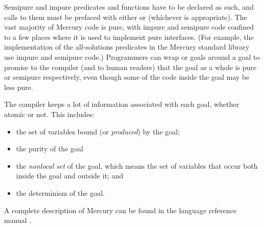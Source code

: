 \noindent
Semipure and impure predicates and functions
have to be declared as such,
and calls to them must be prefaced with either
 or  (whichever is appropriate).
The vast majority of Mercury code is pure,
with impure and semipure code confined to a few places
where it is used to implement pure interfaces.
(For example, the implementation of the all-solutions predicates
in the Mercury standard library use impure and semipure code.)
Programmers can wrap
 or  goals around a goal
to promise to the compiler (and to human readers) that
the goal as a whole is pure or semipure respectively,
even though some of the code inside the goal may be less pure.

The compiler keeps a lot of information associated with each goal,
whether atomic or not.
This includes:

\begin{itemize}
\item
the set of variables bound (or \emph{produced}) by the goal;
\item
the purity of the goal
\item
the \emph{nonlocal set} of the goal,
which means the set of variables
that occur both inside the goal and outside it; and
\item
the determinism of the goal.
\end{itemize}

\noindent
A complete description of Mercury
can be found in the language reference manual \citep{mercury_refman}.

